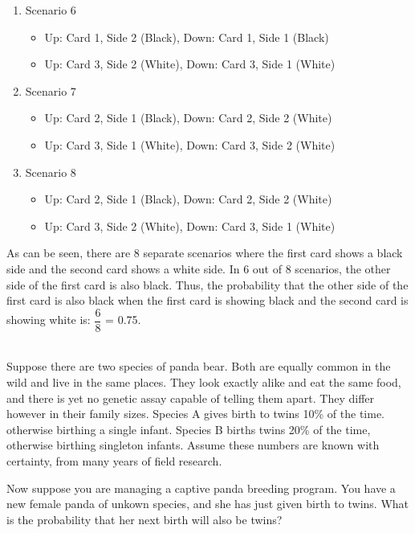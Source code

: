\documentclass[12pt]{article}\usepackage[]{graphicx}\usepackage[]{color}
\newenvironment{problem}[2][Problem]{\begin{trivlist}
\item[\hskip \labelsep {\bfseries #1}\hskip \labelsep {\bfseries #2.}]}{\end{trivlist}}
\newcommand{\textfrac}[2]{\dfrac{\text{#1}}{\text{#2}}}
\begin{document}
\begin{enumerate}
\begin{itemize}
  \end{itemize}
  \item Scenario 6
  \begin{itemize}
    \item Up: Card 1, Side 2 (Black), Down: Card 1, Side 1 (Black)
    \item Up: Card 3, Side 2 (White), Down: Card 3, Side 1 (White)
  \end{itemize}
  \item Scenario 7
  \begin{itemize}
    \item Up: Card 2, Side 1 (Black), Down: Card 2, Side 2 (White)
    \item Up: Card 3, Side 1 (White), Down: Card 3, Side 2 (White)
  \end{itemize}
  \item Scenario 8
  \begin{itemize}
    \item Up: Card 2, Side 1 (Black), Down: Card 2, Side 2 (White)
    \item Up: Card 3, Side 2 (White), Down: Card 3, Side 1 (White)
  \end{itemize}
\end{enumerate}

As can be seen, there are 8 separate scenarios where the first card shows a black side and the second card shows a white side. In 6 out of 8 scenarios, the other side of the first card is also black. Thus, the probability that the other side of the first card is also black when the first card is showing black and the second card is showing white is: $\textfrac{6}{8}$ = 0.75.

\begin{problem}{2H1}
\text{}\\
Suppose there are two species of panda bear. Both are equally common in the wild and live in the same places. They look exactly alike and eat the same food, and there is yet no genetic assay capable of telling them apart. They differ however in their family sizes. Species A gives birth to twins 10\% of the time. otherwise birthing a single infant. Species B births twins 20\% of the time, otherwise birthing singleton infants. Assume these numbers are known with certainty, from many years of field research.

Now suppose you are managing a captive panda breeding program. You have a new female panda of unkown species, and she has just given birth to twins. What is the probability that her next birth will also be twins?
\end{problem}
\end{document}
